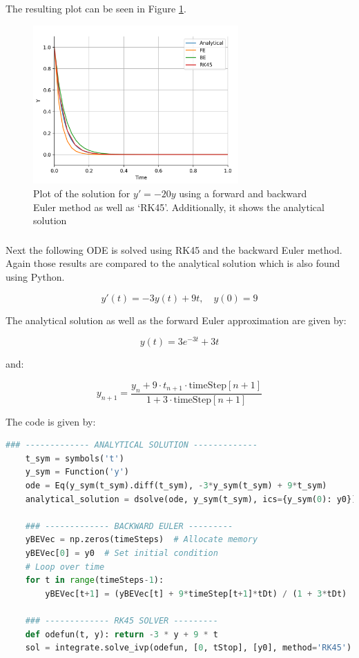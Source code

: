 \documentclass{article}
\begin{document}
    \vspace{10pt}
    The resulting plot can be seen in Figure \ref{fig:RK45}.

    \begin{figure}[h!]
        \centering
        \includegraphics[width=0.7\textwidth]{RK45.png}
        \caption{Plot of the solution for $y'=-20y$ using a forward and backward Euler method as well as ‘RK45’. Additionally, it shows the analytical solution}
        \label{fig:RK45}
    \end{figure}

    \subsubsection{}
    Next the following ODE is solved using RK45 and the backward Euler method. Again those results are compared to the analytical solution which is also found using Python.

    \[ y'(t) = -3y(t) + 9t, \quad y(0) = 9 \]

    The analytical solution as well as the forward Euler approximation are given by:

    \[ y(t) = 3e^{-3t} + 3t \]

    and:

    \[ y_{n+1} = \frac{y_n + 9 \cdot t_{n+1} \cdot \text{{timeStep}}[n+1]}{1 + 3 \cdot \text{{timeStep}}[n+1]} \]

    \vspace{80pt}
    The code is given by:
    \begin{lstlisting}[language=Python, style=mystyle]
    ### ------------- ANALYTICAL SOLUTION -------------
    t_sym = symbols('t')
    y_sym = Function('y')
    ode = Eq(y_sym(t_sym).diff(t_sym), -3*y_sym(t_sym) + 9*t_sym)
    analytical_solution = dsolve(ode, y_sym(t_sym), ics={y_sym(0): y0})

    ### ------------- BACKWARD EULER ---------
    yBEVec = np.zeros(timeSteps)  # Allocate memory
    yBEVec[0] = y0  # Set initial condition
    # Loop over time
    for t in range(timeSteps-1):
        yBEVec[t+1] = (yBEVec[t] + 9*timeStep[t+1]*tDt) / (1 + 3*tDt)

    ### ------------- RK45 SOLVER ---------
    def odefun(t, y): return -3 * y + 9 * t
    sol = integrate.solve_ivp(odefun, [0, tStop], [y0], method='RK45')
    \end{lstlisting}
\end{document}

